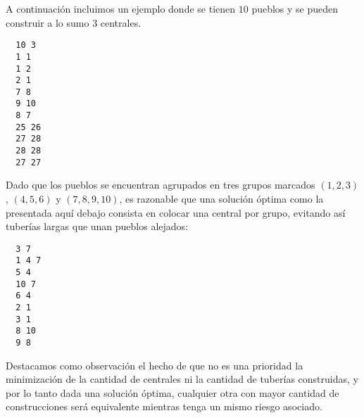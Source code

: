 A continuación incluimos un ejemplo donde se tienen $10$ pueblos y se pueden construir a lo sumo $3$ centrales.
\begin{verbatim}
  10 3
  1 1
  1 2
  2 1
  7 8
  9 10
  8 7
  25 26
  27 28
  28 28
  27 27
\end{verbatim}

Dado que los pueblos se encuentran agrupados en tres grupos marcados $(1, 2, 3)$, $(4, 5, 6)$ y $(7, 8, 9, 10)$, es razonable que una solución óptima como la presentada aquí debajo consista en colocar una central por grupo, evitando así tuberías largas que unan pueblos alejados:

\begin{verbatim}
  3 7
  1 4 7 
  5 4
  10 7
  6 4
  2 1
  3 1
  8 10
  9 8
\end{verbatim}

Destacamos como observación el hecho de que no es una prioridad la minimización de la cantidad de centrales ni la cantidad de tuberías construidas, y por lo tanto dada una solución óptima, cualquier otra con mayor cantidad de construcciones será equivalente mientras tenga un mismo riesgo asociado.